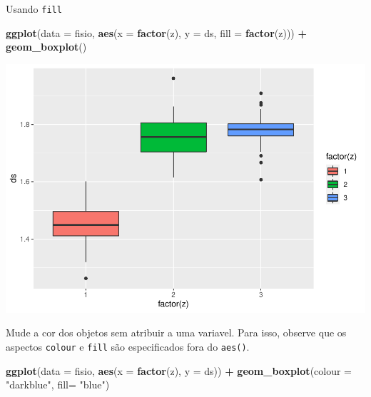 \documentclass[
]{book}
\newenvironment{Shaded}{\begin{snugshade}}{\end{snugshade}}
\newcommand{\DataTypeTok}[1]{\textcolor[rgb]{0.13,0.29,0.53}{#1}}
\newcommand{\KeywordTok}[1]{\textcolor[rgb]{0.13,0.29,0.53}{\textbf{#1}}}
\newcommand{\NormalTok}[1]{#1}
\newcommand{\OperatorTok}[1]{\textcolor[rgb]{0.81,0.36,0.00}{\textbf{#1}}}
\newcommand{\StringTok}[1]{\textcolor[rgb]{0.31,0.60,0.02}{#1}}
\begin{document}
Usando \texttt{fill}

\begin{Shaded}
\begin{Highlighting}[]
\KeywordTok{ggplot}\NormalTok{(}\DataTypeTok{data =}\NormalTok{ fisio, }\KeywordTok{aes}\NormalTok{(}\DataTypeTok{x =} \KeywordTok{factor}\NormalTok{(z), }\DataTypeTok{y =}\NormalTok{ ds, }\DataTypeTok{fill =} \KeywordTok{factor}\NormalTok{(z))) }\OperatorTok{+}
\StringTok{  }\KeywordTok{geom_boxplot}\NormalTok{()}
\end{Highlighting}
\end{Shaded}

\includegraphics{TudodoR_files/figure-latex/unnamed-chunk-201-1.pdf}

Mude a cor dos objetos sem atribuir a uma variavel. Para isso, observe que os aspectos \texttt{colour} e \texttt{fill} são especificados fora do \texttt{aes()}.

\begin{Shaded}
\begin{Highlighting}[]
\KeywordTok{ggplot}\NormalTok{(}\DataTypeTok{data =}\NormalTok{ fisio, }\KeywordTok{aes}\NormalTok{(}\DataTypeTok{x =} \KeywordTok{factor}\NormalTok{(z), }\DataTypeTok{y =}\NormalTok{ ds)) }\OperatorTok{+}
\StringTok{  }\KeywordTok{geom_boxplot}\NormalTok{(}\DataTypeTok{colour =} \StringTok{"darkblue"}\NormalTok{, }\DataTypeTok{fill=} \StringTok{"blue"}\NormalTok{)}
\end{Highlighting}
\end{Shaded}
\end{document}
